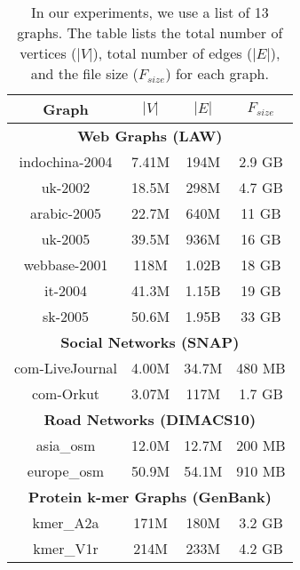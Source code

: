 \begin{table}[!ht]
  \centering
  \caption{In our experiments, we use a list of 13 graphs. The table lists the total number of vertices ($|V|$), total number of edges ($|E|$), and the file size ($F_{size}$) for each graph.}
  \label{tab:dataset}
  \begin{tabular}{|c||c|c|c|}
    \toprule
    \textbf{Graph} &
    \textbf{\textbf{$|V|$}} &
    \textbf{\textbf{$|E|$}} &
    \textbf{\textbf{$F_{size}$}} \\
    \midrule
    \multicolumn{4}{|c|}{\textbf{Web Graphs (LAW)}} \\ \hline
    indochina-2004 & 7.41M & 194M & 2.9 GB \\ \hline
    uk-2002 & 18.5M & 298M & 4.7 GB \\ \hline
    arabic-2005 & 22.7M & 640M & 11 GB \\ \hline
    uk-2005 & 39.5M & 936M & 16 GB \\ \hline
    webbase-2001 & 118M & 1.02B & 18 GB \\ \hline
    it-2004 & 41.3M & 1.15B & 19 GB \\ \hline
    sk-2005 & 50.6M & 1.95B & 33 GB \\ \hline
    \multicolumn{4}{|c|}{\textbf{Social Networks (SNAP)}} \\ \hline
    com-LiveJournal & 4.00M & 34.7M & 480 MB \\ \hline
    com-Orkut & 3.07M & 117M & 1.7 GB \\ \hline
    \multicolumn{4}{|c|}{\textbf{Road Networks (DIMACS10)}} \\ \hline
    asia\_osm & 12.0M & 12.7M & 200 MB \\ \hline
    europe\_osm & 50.9M & 54.1M & 910 MB \\ \hline
    \multicolumn{4}{|c|}{\textbf{Protein k-mer Graphs (GenBank)}} \\ \hline
    kmer\_A2a & 171M & 180M & 3.2 GB \\ \hline
    kmer\_V1r & 214M & 233M & 4.2 GB \\ \hline
  \bottomrule
  \end{tabular}
  \end{table}
